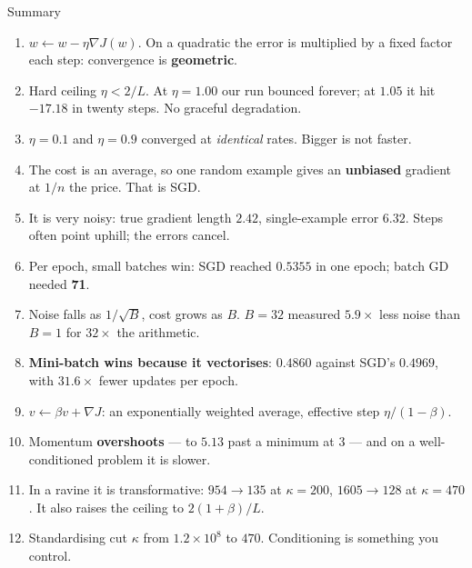 \documentclass[aspectratio=169]{beamer}
\begin{document}
\begin{frame}[shrink=12]{Summary}
  \begin{enumerate}\small
    \item $w \leftarrow w - \eta \nabla J(w)$. On a quadratic the error is
      multiplied by a fixed factor each step: convergence is \textbf{geometric}.
    \item Hard ceiling $\eta < 2/L$. At $\eta=1.00$ our run bounced forever; at
      $1.05$ it hit $-17.18$ in twenty steps. No graceful degradation.
    \item $\eta = 0.1$ and $\eta = 0.9$ converged at \emph{identical} rates.
      Bigger is not faster.
    \item The cost is an average, so one random example gives an
      \textbf{unbiased} gradient at $1/n$ the price. That is SGD.
    \item It is very noisy: true gradient length $2.42$, single-example error
      $6.32$. Steps often point uphill; the errors cancel.
    \item Per epoch, small batches win: SGD reached $0.5355$ in one epoch;
      batch GD needed \textbf{71}.
    \item Noise falls as $1/\sqrt{B}$, cost grows as $B$. $B{=}32$ measured
      $5.9\times$ less noise than $B{=}1$ for $32\times$ the arithmetic.
    \item \textbf{Mini-batch wins because it vectorises}: $0.4860$ against
      SGD's $0.4969$, with $31.6\times$ fewer updates per epoch.
    \item $v \leftarrow \beta v + \nabla J$: an exponentially weighted average,
      effective step $\eta/(1-\beta)$.
    \item Momentum \textbf{overshoots} --- to $5.13$ past a minimum at $3$ ---
      and on a well-conditioned problem it is slower.
    \item In a ravine it is transformative: $954 \to 135$ at $\kappa=200$,
      $1605 \to 128$ at $\kappa=470$. It also raises the ceiling to
      $2(1+\beta)/L$.
    \item Standardising cut $\kappa$ from $1.2\times10^8$ to $470$.
      Conditioning is something you control.
  \end{enumerate}
\end{frame}
\end{document}
